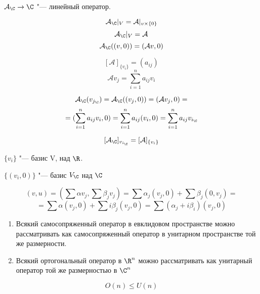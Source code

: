 $\mathcal{A}_{\C} \to \C$ "--- линейный оператор.

$$\mathcal{A}_{\C}|_{V} = \mathcal{A}|_{v \times \{0\}}$$
$$\mathcal{A}_{\C}|_{V} = \mathcal{A}$$
$$\mathcal{A}_{\C}((v, 0)) = (\mathcal{A}v, 0)$$

$$[\mathcal{A}]_{\{v_i\}} = (a_{ij})$$
$$\mathcal{A} v_j = \sum_{i = 1}^n a_{ij}v_i$$

$$\mathcal{A}_{\C}(v_{j_{\C}}) = \mathcal{A}_{\C}((v_j, 0)) = (\mathcal{A}v_j, 0) = $$
$$= (\sum_{i = 1}^{n}a_{ij}v_i, 0) = \sum_{i = 1}^{n}a_{ij}(v_i, 0) = \sum_{i = 1}^{n}a_{ij}v_{i_{\C}}$$

$$[\mathcal{A}_{\C}]_{v_{i_{\C}}} = [\mathcal{A}]_{\{v_i\}}$$

$\{v_i\}$ "--- базис V, над $\R$.

$\{(v_i, 0)\}$  "--- базис $V_{\C}$ над $\C$

$$(v, u) = (\sum \alpha v_j, \sum \beta_{j}v_j) = \sum \alpha_j(v_j, 0) + \sum \beta_j(0, v_j) = $$
$$= \sum \alpha(v_j, 0) + \sum i \beta_j(v_j, 0) = \sum(\alpha_j + i \beta_i)(v_j, 0)$$

\begin{exmp}
    \begin{enumerate}
    \item Всякий самосопряженный оператор в евклидовом пространстве
    можно рассматривать как самосопряженный оператор в унитарном пространстве той же
    размерности. 
    \item Всякий ортогональный оператор в $\R^n$ можно рассматривать как унитарный оператор той же
    размерностью в $\C^n$
    \end{enumerate}
\end{exmp}
\begin{conseq}
   $$O(n) \le U(n)$$
\end{conseq}